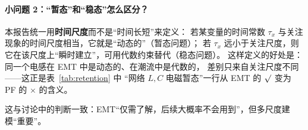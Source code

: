 \paragraph{小问题 2：“暂态”和“稳态”怎么区分？}
本报告统一用\textbf{时间尺度}而不是“时间长短”来定义：
若某变量的时间常数 $\tau_x$ 与关注现象的时间尺度相当，它就是“动态的”（暂态问题）；
若 $\tau_x$ 远小于关注尺度，则它在该尺度上“瞬时建立”，可用代数约束替代（稳态问题）。
这样定义的好处是：同一个电感在 EMT 中是动态的、在潮流中是代数的，
差别只来自关注尺度不同——这正是表~\ref{tab:retention} 中
“网络 $L,C$ 电磁暂态”一行从 EMT 的 $\surd$ 变为 PF 的 $\times$ 的含义。

这与讨论中的判断一致：EMT“仅需了解，后续大概率不会用到”，但多尺度建模“重要”。
